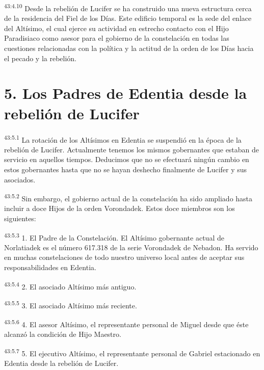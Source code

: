 \par
\textsuperscript{43:4.10} Desde la rebelión de Lucifer se ha construido una nueva estructura cerca de la residencia del Fiel de los Días. Este edificio temporal es la sede del enlace del Altísimo, el cual ejerce su actividad en estrecho contacto con el Hijo Paradisiaco como asesor para el gobierno de la constelación en todas las cuestiones relacionadas con la política y la actitud de la orden de los Días hacia el pecado y la rebelión.

\section*{5. Los Padres de Edentia desde la rebelión de Lucifer}
\par
\textsuperscript{43:5.1} La rotación de los Altísimos en Edentia se suspendió en la época de la rebelión de Lucifer. Actualmente tenemos los mismos gobernantes que estaban de servicio en aquellos tiempos. Deducimos que no se efectuará ningún cambio en estos gobernantes hasta que no se hayan deshecho finalmente de Lucifer y sus asociados.

\par
\textsuperscript{43:5.2} Sin embargo, el gobierno actual de la constelación ha sido ampliado hasta incluir a doce Hijos de la orden Vorondadek. Estos doce miembros son los siguientes:

\par
\textsuperscript{43:5.3} 1. El Padre de la Constelación. El Altísimo gobernante actual de Norlatiadek es el número 617.318 de la serie Vorondadek de Nebadon. Ha servido en muchas constelaciones de todo nuestro universo local antes de aceptar sus responsabilidades en Edentia.

\par
\textsuperscript{43:5.4} 2. El asociado Altísimo más antiguo.

\par
\textsuperscript{43:5.5} 3. El asociado Altísimo más reciente.

\par
\textsuperscript{43:5.6} 4. El asesor Altísimo, el representante personal de Miguel desde que éste alcanzó la condición de Hijo Maestro.

\par
\textsuperscript{43:5.7} 5. El ejecutivo Altísimo, el representante personal de Gabriel estacionado en Edentia desde la rebelión de Lucifer.

